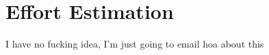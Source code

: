 
\part{Effort Estimation} %

\label{Part5} %

%
%
%
I have no fucking idea, I'm just going to email hoa about this